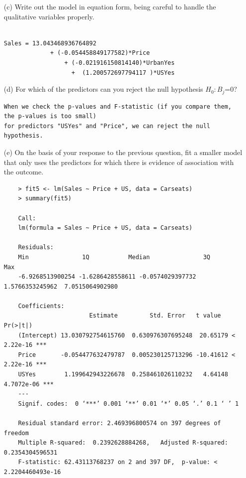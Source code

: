 \documentclass{article}
\begin{document}
\begin{itemize}
\begin{lstlisting}
\end{lstlisting}

\newpage

\item[(c)] Write out the model in equation form, being careful to handle the qualitative variables properly.

\begin{lstlisting}

Sales = 13.043468936764892 
             + (-0.054458849177582)*Price 
                 + (-0.021916150814140)*UrbanYes 
                   +  (1.200572697794117 )*USYes
\end{lstlisting}

\item[(d)] For which of the predictors can you reject the null hypothesis $H_0 : B_j $=0?

\begin{lstlisting}
When we check the p-values and F-statistic (if you compare them, the p-values is too small) 
for predictors "USYes" and "Price", we can reject the null hypothesis.
\end{lstlisting}

\item[(e)] On the basis of your response to the previous question, fit a smaller model that only uses the predictors for which there is evidence of association with the outcome.


\begin{program}
	\begin{verbatim}
	> fit5 <- lm(Sales ~ Price + US, data = Carseats)
	> summary(fit5)
	
	Call:
	lm(formula = Sales ~ Price + US, data = Carseats)
	
	Residuals:
	Min               1Q           Median               3Q              Max 
	-6.9268513900254 -1.6286428558611 -0.0574029397732  1.5766353245962  7.0515064902980 
	
	Coefficients:
                     	Estimate         Std. Error   t value   Pr(>|t|)    
	(Intercept) 13.030792754615760  0.630976307695248  20.65179 < 2.22e-16 ***
	Price       -0.054477632479787  0.005230125713296 -10.41612 < 2.22e-16 ***
	USYes        1.199642943226678  0.258461026110232   4.64148 4.7072e-06 ***
	---
	Signif. codes:  0 ‘***’ 0.001 ‘**’ 0.01 ‘*’ 0.05 ‘.’ 0.1 ‘ ’ 1
	
	Residual standard error: 2.469396800574 on 397 degrees of freedom
	Multiple R-squared:  0.2392628884268,	Adjusted R-squared:  0.2354304596531 
	F-statistic: 62.43113768237 on 2 and 397 DF,  p-value: < 2.2204460493e-16
		

\end{verbatim}
\end{program}
\end{itemize}
\end{document}
